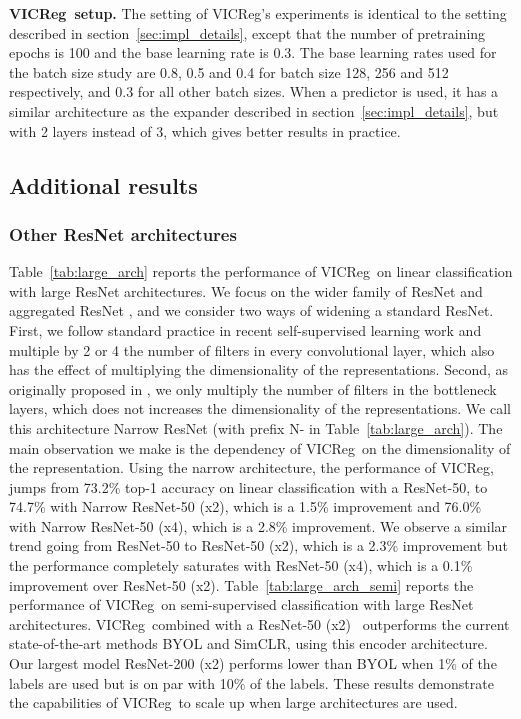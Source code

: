\documentclass{article}
\newcommand{\algo}{VICReg}
\begin{document}
\textbf{\algo \ setup.} The setting of \algo's experiments is identical to the setting described in section~\ref{sec:impl_details}, except that the number of pretraining epochs is 100 and the base learning rate is 0.3. The base learning rates used for the batch size study are 0.8, 0.5 and 0.4 for batch size 128, 256 and 512 respectively, and 0.3 for all other batch sizes. When a predictor is used, it has a similar architecture as the expander described in section~\ref{sec:impl_details}, but with 2 layers instead of 3, which gives better results in practice.

\subsection{Additional results} \label{app:additional_results}

\subsubsection{Other ResNet architectures}

Table~\ref{tab:large_arch} reports the performance of \algo \ on linear classification with large ResNet architectures. We focus on the wider family of ResNet \cite{zagoruyko2016resnetwide} and aggregated ResNet \cite{xie2017resnext}, and we consider two ways of widening a standard ResNet. First, we follow standard practice in recent self-supervised learning work \cite{caron2020swav, grill2020byol, chen2020simclr} and multiple by 2 or 4 the number of filters in every convolutional layer, which also has the effect of multiplying the dimensionality of the representations. Second, as originally proposed in \cite{zagoruyko2016resnetwide}, we only multiply the number of filters in the bottleneck layers, which does not increases the dimensionality of the representations. We call this architecture Narrow ResNet (with prefix N- in Table~\ref{tab:large_arch}). The main observation we make is the dependency of \algo \ on the dimensionality of the representation. Using the narrow architecture, the performance of \algo, jumps from 73.2\% top-1 accuracy on linear classification with a ResNet-50, to 74.7\% with Narrow ResNet-50 (x2), which is a 1.5\% improvement and 76.0\% with Narrow ResNet-50 (x4), which is a 2.8\% improvement. We observe a similar trend going from ResNet-50 to ResNet-50 (x2), which is a 2.3\% improvement but the performance completely saturates with ResNet-50 (x4), which is a 0.1\% improvement over ResNet-50 (x2). Table~\ref{tab:large_arch_semi} reports the performance of \algo \ on semi-supervised classification with large ResNet architectures. \algo \ combined with a ResNet-50 (x2) \ outperforms the current state-of-the-art methods BYOL and SimCLR, using this encoder architecture. Our largest model ResNet-200 (x2) performs lower than BYOL when 1\% of the labels are used but is on par with 10\% of the labels. These results demonstrate the capabilities of \algo \ to scale up when large architectures are used.
\end{document}
